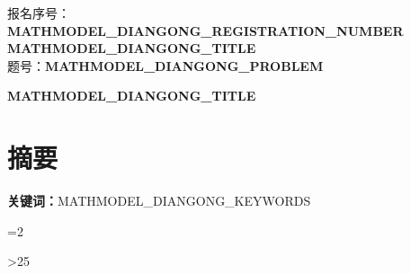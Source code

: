 \documentclass[12pt,a4paper]{ctexart}
\newcounter{diangongbodystart}
\newcounter{diangongbodypages}
\begin{document}
\begin{titlepage}
\thispagestyle{empty}
\begin{center}
\vspace*{3cm}
{\Large 报名序号：\textbf{MATHMODEL_DIANGONG_REGISTRATION_NUMBER}}\\[2cm]
{\Huge \textbf{MATHMODEL_DIANGONG_TITLE}}\\[1cm]
{\Large 题号：\textbf{MATHMODEL_DIANGONG_PROBLEM}}
\end{center}
\end{titlepage}

\clearpage
{}
\pagestyle{plain}
\begin{center}
{\bfseries MATHMODEL_DIANGONG_TITLE}
\end{center}
\section*{摘要}

\textbf{关键词：}MATHMODEL_DIANGONG_KEYWORDS

\clearpage
\ifnum\value{page}=2\relax\else
  \PackageError{mathmodel-diangong}{Abstract must fit on one page}{Shorten the abstract.}
\fi
\setcounter{diangongbodystart}{\value{page}}








\clearpage
\setcounter{diangongbodypages}{\numexpr\value{page}-\value{diangongbodystart}\relax}
\ifnum\value{diangongbodypages}>25\relax
  \PackageError{mathmodel-diangong}{Body exceeds 25 pages}{Shorten the body.}
\fi
\appendix
\end{document}
